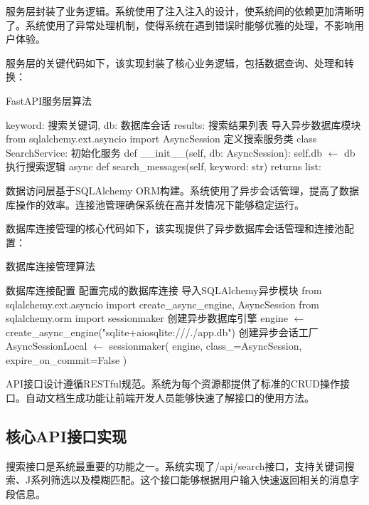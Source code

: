 服务层封装了业务逻辑。系统使用了注入注入的设计，使系统间的依赖更加清晰明了。系统使用了异常处理机制，使得系统在遇到错误时能够优雅的处理，不影响用户体验。

服务层的关键代码如下，该实现封装了核心业务逻辑，包括数据查询、处理和转换：

\begin{algorithm}[H]
\caption{FastAPI服务层算法}
\begin{algorithmic}[1]
\REQUIRE keyword: 搜索关键词, db: 数据库会话
\ENSURE results: 搜索结果列表
\STATE 导入异步数据库模块
\STATE from sqlalchemy.ext.asyncio import AsyncSession
\STATE 定义搜索服务类
\STATE class SearchService:
\STATE     初始化服务
\STATE     def \_\_init\_\_(self, db: AsyncSession):
\STATE         self.db $\leftarrow$ db
\STATE     执行搜索逻辑
\STATE     async def search\_messages(self, keyword: str) returns list:
\STATE         \RETURN []
\end{algorithmic}
\end{algorithm}

数据访问层基于SQLAlchemy ORM构建。系统使用了异步会话管理，提高了数据库操作的效率。连接池管理确保系统在高并发情况下能够稳定运行。

数据库连接管理的核心代码如下，该实现提供了异步数据库会话管理和连接池配置：

\begin{algorithm}[H]
\caption{数据库连接管理算法}
\begin{algorithmic}[1]
\REQUIRE 数据库连接配置
\ENSURE 配置完成的数据库连接
\STATE 导入SQLAlchemy异步模块
\STATE from sqlalchemy.ext.asyncio import create\_async\_engine, AsyncSession
\STATE from sqlalchemy.orm import sessionmaker
\STATE 创建异步数据库引擎
\STATE engine $\leftarrow$ create\_async\_engine("sqlite+aiosqlite:///./app.db")
\STATE 创建异步会话工厂
\STATE AsyncSessionLocal $\leftarrow$ sessionmaker(
\STATE     engine, class\_=AsyncSession, expire\_on\_commit=False
\STATE )
\end{algorithmic}
\end{algorithm}

API接口设计遵循RESTful规范。系统为每个资源都提供了标准的CRUD操作接口。自动文档生成功能让前端开发人员能够快速了解接口的使用方法。



\subsection{核心API接口实现}

搜索接口是系统最重要的功能之一。系统实现了/api/search接口，支持关键词搜索、J系列筛选以及模糊匹配。这个接口能够根据用户输入快速返回相关的消息字段信息。

